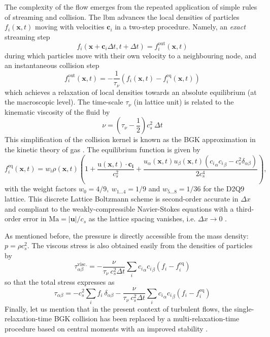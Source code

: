 %
The complexity of the flow emerges from the repeated application of simple rules of streaming and collision. The \ac{lbm} advances the local densities of particles $f_i(\mathbf{x},t)$ moving with velocities $\mathbf{c}_i$  in a two-step procedure. Namely, an \emph{exact} streaming step
\begin{equation}
  \label{eq:lbe}
  f_i(\mathbf{x}+\mathbf{c}_i \Delta t, t + \Delta t) = f_i^{\mathrm{out}}(\mathbf{x},t)
\end{equation}
during which particles move with their own velocity to a neighbouring node, and an instantaneous collision step
\[
f_i^{\mathrm{out}}(\mathbf{x},t) = -\frac 1 {\tau_\nu} \left(f_i(\mathbf{x},t) - f_i^\mathrm{eq}(\mathbf{x},t) \right)
\]
which achieves a relaxation of local densities towards an absolute equilibrium (at the macroscopic level). The time-scale $\tau_\nu$ (in lattice unit) is related to the kinematic viscosity of the fluid by
\[
\nu = \left( {\tau_\nu} - \frac 1 2 \right) c_s^2 ~\Delta t
\]
This simplification of the collision kernel is known as the BGK approximation in the kinetic theory of gas \citep{BGK}.
%
The equilibrium function is given by
\begin{equation}
  \label{eq:lbe_eq}
  f_i^\mathrm{eq}(\mathbf{x},t) = w_i  \rho(\mathbf{x},t) \left( 1 + \frac{\mathrm u(\mathbf{x},t) \cdot \mathbf{c_i}}{c_s^2} +
    \frac{u_\alpha(\mathbf{x},t) u_\beta(\mathbf{x},t)({c_i}_\alpha {c_i}_\beta - c_s^2 \delta_{\alpha\beta})}{2 c_s^4} \right),
\end{equation}
with the weight factors $w_0=4/9,~w_{1...4} = 1/9$ and $w_{5...8}=1/36$ for the D2Q9 lattice.
This discrete Lattice Boltzmann scheme is second-order accurate in $\Delta x $ and compliant to the weakly-compressible Navier-Stokes equations with a third-order error in $\mathrm{Ma}=|\mathbf{u}|/c_s$ as the lattice spacing vanishes, i.e. $\Delta x \to 0$ \citep{succi_book}.

As mentioned before, the pressure is directly accessible from the mass density: $p = \rho c_s^2$. The viscous stress is also obtained easily from the densities of particles by
\[
\tau^\mathrm{visc.}_{\alpha \beta} = -\frac{\nu}{\tau_\nu ~ c_s^2 \Delta t} \sum_i  {c_i}_\alpha {c_i}_\beta (f_i - f_i^\mathrm{eq})
\]
so that the total stress expresses as
\begin{equation}\label{eq:def_stress}
\tau_{\alpha \beta} = -  c_s^2 \sum_i f_i ~ \delta_{\alpha\beta}  - \frac{\nu}{\tau_\nu ~ c_s^2 \Delta t} \sum_i  {c_i}_\alpha {c_i}_\beta (f_i - f_i^\mathrm{eq})
\end{equation}
Finally, let us mention that in the present context of turbulent flows, the single-relaxation-time BGK collision has been replaced by a multi-relaxation-time procedure based on central moments with an improved stability \citep{De_Rosis_2016}.


